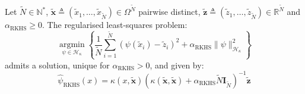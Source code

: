 \begin{proposition}\label{th:RKHS_regularisation}
	Let $\tilde{N}\in\mathbb{N}^*$, $\tilde{\mathbf{x}}\triangleq(\tilde{x}_1,\dots,\tilde{x}_{\tilde{N}})\in\Omega^{\tilde{N}}$ pairwise distinct, $\tilde{\mathbf{z}}\triangleq(\tilde{z}_1,\dots,\tilde{z}_{\tilde{N}})\in\mathbb{R}^{\tilde{N}}$ and $\alpha_{\mathrm{RKHS}}\geq0$. The regularised least-squares problem:
	\begin{equation}
		\underset{\psi\in\mathcal{H}_\kappa}{\operatorname{argmin}}\left\{\frac{1}{\tilde{N}}\sum_{i=1}^{\tilde{N}}\left(\psi(\tilde{x}_i)-\tilde{z}_i\right)^2+\alpha_{\mathrm{RKHS}}\|\psi\|_{\mathcal{H}_\kappa}^2\right\}\label{eq:RKHS_LS}
	\end{equation}
	admits a solution, unique for $\alpha_{\mathrm{RKHS}}>0$, and given by:
	\begin{equation}
		\hat{\psi}_{\mathrm{RKHS}}(x)=\kappa(x,\tilde{\mathbf{x}})\left(\kappa(\tilde{\mathbf{x}},\tilde{\mathbf{x}})+\alpha_{\mathrm{RKHS}}\tilde{N}\mathbf{I}_{\tilde{N}}\right)^{-1}\tilde{\mathbf{z}}
	\end{equation}
\end{proposition}

